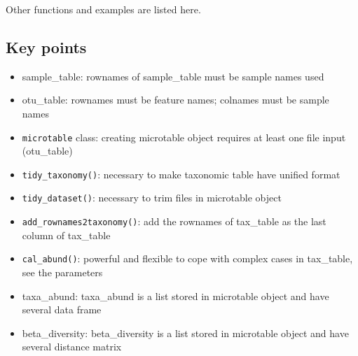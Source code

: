 \documentclass[
]{book}
\newenvironment{Shaded}{\begin{snugshade}}{\end{snugshade}}
\newcommand{\AttributeTok}[1]{\textcolor[rgb]{0.13,0.29,0.53}{#1}}
\newcommand{\CommentTok}[1]{\textcolor[rgb]{0.56,0.35,0.01}{\textit{#1}}}
\newcommand{\DecValTok}[1]{\textcolor[rgb]{0.00,0.00,0.81}{#1}}
\newcommand{\FunctionTok}[1]{\textcolor[rgb]{0.13,0.29,0.53}{\textbf{#1}}}
\newcommand{\NormalTok}[1]{#1}
\newcommand{\OtherTok}[1]{\textcolor[rgb]{0.56,0.35,0.01}{#1}}
\newcommand{\SpecialCharTok}[1]{\textcolor[rgb]{0.81,0.36,0.00}{\textbf{#1}}}
\newcommand{\StringTok}[1]{\textcolor[rgb]{0.31,0.60,0.02}{#1}}
\providecommand{\tightlist}{%
  \setlength{\itemsep}{0pt}\setlength{\parskip}{0pt}}
\begin{document}
Other functions and examples are listed here.

\begin{Shaded}
\end{Shaded}

\subsection{Key points}\label{key-points}

\begin{itemize}
\tightlist
\item
  sample\_table: rownames of sample\_table must be sample names used
\item
  otu\_table: rownames must be feature names; colnames must be sample names
\item
  \texttt{microtable} class: creating microtable object requires at least one file input (otu\_table)
\item
  \texttt{tidy\_taxonomy()}: necessary to make taxonomic table have unified format
\item
  \texttt{tidy\_dataset()}: necessary to trim files in microtable object
\item
  \texttt{add\_rownames2taxonomy()}: add the rownames of tax\_table as the last column of tax\_table
\item
  \texttt{cal\_abund()}: powerful and flexible to cope with complex cases in tax\_table, see the parameters
\item
  taxa\_abund: taxa\_abund is a list stored in microtable object and have several data frame
\item
  beta\_diversity: beta\_diversity is a list stored in microtable object and have several distance matrix
\end{itemize}
\end{document}
